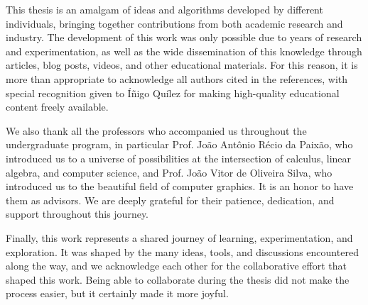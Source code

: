 This thesis is an amalgam of ideas and algorithms developed by different individuals, bringing together contributions from both academic research and industry. The development of this work was only possible due to years of research and experimentation, as well as the wide dissemination of this knowledge through articles, blog posts, videos, and other educational materials. For this reason, it is more than appropriate to acknowledge all authors cited in the references, with special recognition given to Íñigo Quílez for making high-quality educational content freely available.

We also thank all the professors who accompanied us throughout the undergraduate program, in particular Prof. João Antônio Récio da Paixão, who introduced us to a universe of possibilities at the intersection of calculus, linear algebra, and computer science, and Prof. João Vitor de Oliveira Silva, who introduced us to the beautiful field of computer graphics. It is an honor to have them as advisors. We are deeply grateful for their patience, dedication, and support throughout this journey.

Finally, this work represents a shared journey of learning, experimentation, and exploration. It was shaped by the many ideas, tools, and discussions encountered along the way, and we acknowledge each other for the collaborative effort that shaped this work. Being able to collaborate during the thesis did not make the process easier, but it certainly made it more joyful.